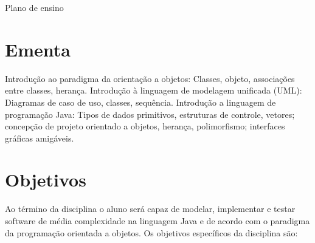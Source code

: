 \documentclass[11pt]{ifscarticle}
\begin{document}
\begin{center}
	{\huge Plano de ensino}\vspace*{.5cm}
\end{center}

\noindent{}\vspace*{.5cm}

\section{Ementa}

Introdução ao paradigma da orientação a objetos: Classes, objeto, associações entre classes, herança. Introdução à linguagem de modelagem unificada (UML): Diagramas de caso de uso, classes, sequência. Introdução a linguagem de programação Java: Tipos de dados primitivos, estruturas de controle, vetores; concepção de projeto orientado a objetos, herança, polimorfismo; interfaces gráficas amigáveis.

\section{Objetivos}

Ao término da disciplina o aluno será capaz de modelar, implementar e testar software de média complexidade na linguagem Java e de acordo com o paradigma da programação orientada a objetos. Os objetivos específicos da disciplina são:
\end{document}
